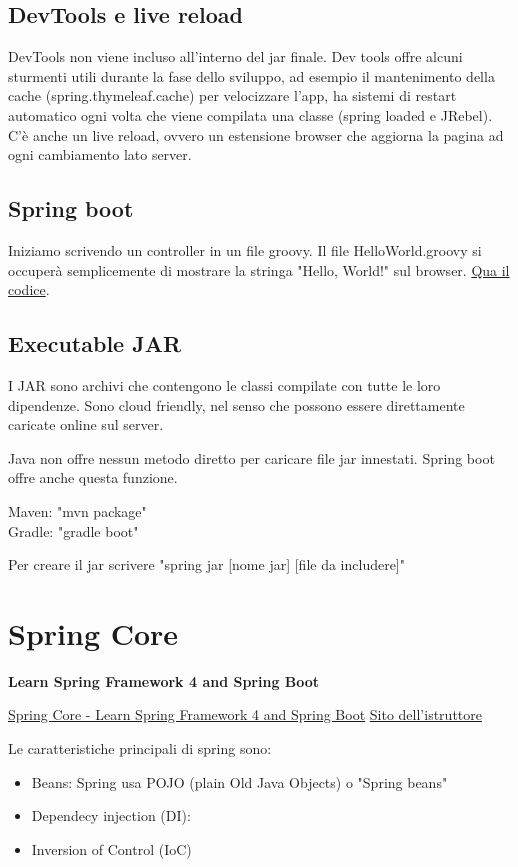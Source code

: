 \documentclass[11pt,a4paper]{book}
\begin{document}
\section{DevTools e live reload}
DevTools non viene incluso all'interno del jar finale. Dev tools offre alcuni sturmenti utili durante la fase dello sviluppo, ad esempio il mantenimento della cache (spring.thymeleaf.cache) per velocizzare l'app, ha sistemi di restart automatico ogni volta che viene compilata una classe (spring loaded e JRebel). C'è anche un live reload, ovvero un estensione browser che aggiorna la pagina ad ogni cambiamento lato server.

\section{Spring boot}
Iniziamo scrivendo un controller in un file groovy. Il file HelloWorld.groovy si occuperà semplicemente di mostrare la stringa "Hello, World!" sul browser.
\href{Codici/HelloWorld.groovy}{Qua il codice}. 

\section{Executable JAR}
I JAR sono archivi che contengono le classi compilate con tutte le loro dipendenze. Sono cloud friendly, nel senso che possono essere direttamente caricate online sul server.

Java non offre nessun metodo diretto per caricare file jar innestati. Spring boot offre anche questa funzione.

Maven: "mvn package" \\
Gradle: "gradle boot"

Per creare il jar scrivere "spring jar [nome jar] [file da includere]"

\chapter{Spring Core}
\begin{center}
	\textbf{Learn Spring Framework 4 and Spring Boot}
\end{center} 
\href{https://www.udemy.com/course/spring-core}{Spring Core - Learn Spring Framework 4 and Spring Boot}
\href{https://springframework.guru/spring-framework-annotations/}{Sito dell'istruttore}

Le caratteristiche principali di spring sono:
\begin{itemize}
	\item Beans: Spring usa POJO (plain Old Java Objects) o "Spring beans"
	\item Dependecy injection (DI): 
	\item Inversion of Control (IoC)
\end{itemize}
\end{document}
